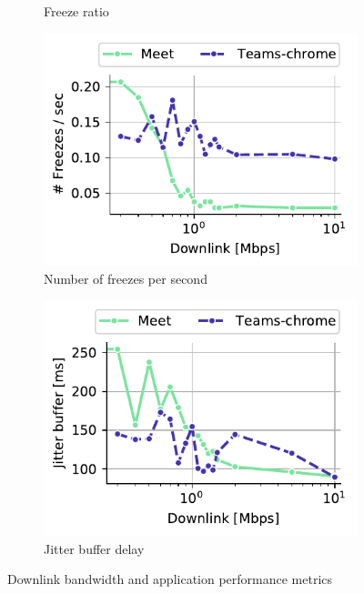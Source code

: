 \begin{figure}[]
\begin{subfigure}[t]{0.3\textwidth}
        \vspace{-2em}
        \caption{Freeze ratio}
 		\label{subfig:downlink_freeze_ratio}
    \end{subfigure}%
    \hfill
	\begin{subfigure}[t]{0.3\textwidth}   
        \centering
        \includegraphics[width=\textwidth]{figures/static/downlink_freezeCountPerSecond.pdf}
        \vspace{-2em}
    \caption{Number of freezes per second}
    \label{subfig:downlink_freeze_per_sec}
    \end{subfigure}%
    \hfill
	\begin{subfigure}[t]{0.3\textwidth}   
        \centering
        \includegraphics[width=\textwidth]{figures/static/downlink_jitter_buffer.pdf}
        \vspace{-2em}
    \caption{Jitter buffer delay}
    \label{subfig:downlink_jitter_buffer}
    \end{subfigure}
	\vspace{-1em}
	\caption{Downlink bandwidth and application performance metrics}
	\label{fig:qoe_distribution}
\end{figure}

